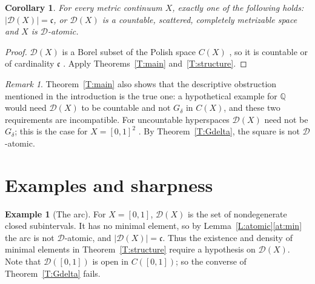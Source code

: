 \documentclass[11pt,reqno]{amsart}
\theoremstyle{plain}
\newtheorem{corollary}[theorem]{Corollary}
\theoremstyle{definition}
\newtheorem{example}[theorem]{Example}
\theoremstyle{remark}
\newtheorem{remark}[theorem]{Remark}
\newcommand{\D}{\mathcal{D}}
\newcommand{\Q}{\mathbb{Q}}
\newcommand{\cc}{\mathfrak{c}}
\begin{document}
\begin{corollary}\label{C:dichotomy}
For every metric continuum $X$, exactly one of the following holds: $|\D(X)|=\cc$, or $\D(X)$ is a countable, scattered, completely metrizable space and $X$ is $\D$-atomic.
\end{corollary}

\begin{proof}
$\D(X)$ is a Borel subset of the Polish space $C(X)$ \cite[Teorema~2.0.2]{Ram23}, so it is countable or of cardinality $\cc$ \cite[Theorem~13.6]{Kechris}. Apply Theorems~\ref{T:main} and~\ref{T:structure}.
\end{proof}

\begin{remark}
Theorem~\ref{T:main} also shows that the descriptive obstruction mentioned in the introduction is the true one: a hypothetical example for $\Q$ would need $\D(X)$ to be countable and not $G_\delta$ in $C(X)$, and these two requirements are incompatible. For uncountable hyperspaces $\D(X)$ need not be $G_\delta$; this is the case for $X=[0,1]^2$ \cite[p.~23]{Ram23}. By Theorem~\ref{T:Gdelta}, the square is not $\D$-atomic.
\end{remark}

\section{Examples and sharpness}\label{S:examples}

\begin{example}[The arc]\label{E:arc}
For $X=[0,1]$, $\D(X)$ is the set of nondegenerate closed subintervals. It has no minimal element, so by Lemma~\ref{L:atomic}\ref{at:min} the arc is not $\D$-atomic, and $|\D(X)|=\cc$. Thus the existence and density of minimal elements in Theorem~\ref{T:structure} require a hypothesis on $\D(X)$. Note that $\D([0,1])$ is open in $C([0,1])$; so the converse of Theorem~\ref{T:Gdelta} fails.
\end{example}
\end{document}
